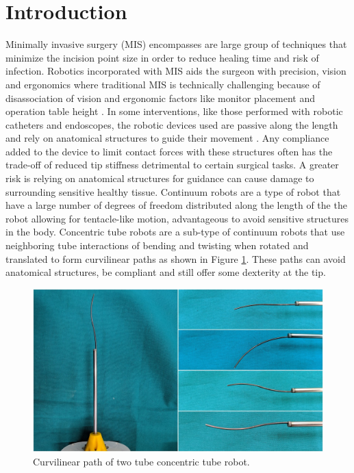 \section{Introduction}
\label{intro}
Minimally invasive surgery (MIS) encompasses are large group of techniques that minimize the incision point size in order to reduce healing time and risk of infection. Robotics incorporated with MIS aids the surgeon with precision, vision and ergonomics where traditional MIS is technically challenging because of disassociation of vision and ergonomic factors like monitor placement and operation table height \cite{palep2009robotic}. In some interventions, like those performed with robotic catheters and endoscopes, the robotic devices used are passive along the length and rely on anatomical structures to guide their movement \cite{dupont2012concentric}. Any compliance added to the device to limit contact forces with these structures often has the trade-off of reduced tip stiffness detrimental to certain surgical tasks. A greater risk is relying on anatomical structures for guidance can cause damage to surrounding sensitive healthy tissue. Continuum robots are a type of robot that have a large number of degrees of freedom distributed along the length of the the robot allowing for tentacle-like motion, advantageous to avoid sensitive structures in the body. Concentric tube robots are a sub-type of continuum robots that use neighboring tube interactions of bending and twisting when rotated and translated to form curvilinear paths as shown in Figure \ref{fig:curvilinear-paths}. These paths can avoid anatomical structures, be compliant and still offer some dexterity at the tip.
\begin{figure}
  \includegraphics[width=\linewidth]{ctr-collage.jpg}
\caption{Curvilinear path of two tube concentric tube robot.}
\label{fig:curvilinear-paths}
\end{figure}


